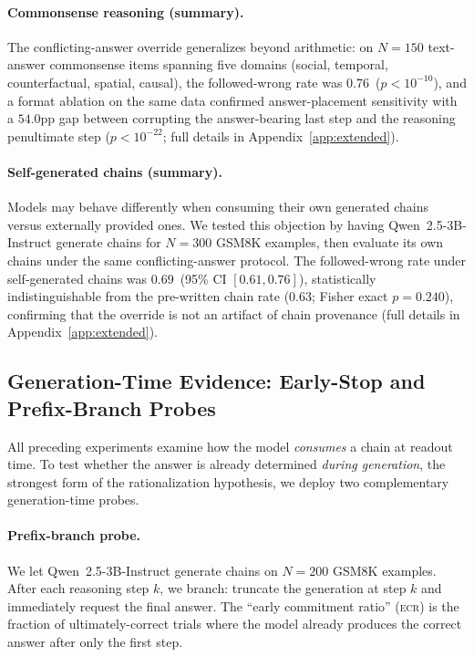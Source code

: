 \documentclass{article}
\theoremstyle{definition}
\theoremstyle{definition}
\newcommand{\CCFW}{0.63}
\newcommand{\CSCCFW}{0.76}
\newcommand{\CSPVAL}{$p{<}10^{-10}$}
\newcommand{\GENNEXAMPLES}{300}
\newcommand{\SGCCFW}{0.69}
\newcommand{\SGCCFWCILOW}{0.61}
\newcommand{\SGCCFWCIHIGH}{0.76}
\newcommand{\SGVSPREWRITTENPVAL}{0.240}
\newcommand{\CSAGAPPVAL}{$p{<}10^{-22}$}
\newcommand{\GENPBN}{200}
\begin{document}
\paragraph{Commonsense reasoning (summary).}
The conflicting-answer override generalizes beyond arithmetic: on $N{=}150$
text-answer commonsense items spanning five domains (social, temporal,
counterfactual, spatial, causal), the followed-wrong rate was \CSCCFW\
(\CSPVAL), and a format ablation on the same data confirmed answer-placement
sensitivity with a $54.0$pp gap between corrupting the answer-bearing last step
and the reasoning penultimate step (\CSAGAPPVAL; full details in
Appendix~\ref{app:extended}).

\paragraph{Self-generated chains (summary).}
Models may behave differently when consuming their own generated chains versus
externally provided ones. We tested this objection by having Qwen~2.5-3B-Instruct
generate chains for $N{=}\GENNEXAMPLES$ GSM8K examples, then evaluate its own chains
under the same conflicting-answer protocol. The followed-wrong rate under self-generated
chains was \SGCCFW\ (95\% CI $[\SGCCFWCILOW, \SGCCFWCIHIGH]$), statistically
indistinguishable from the pre-written chain rate (\CCFW; Fisher exact
$p{=}\SGVSPREWRITTENPVAL$), confirming that the override is not an artifact of
chain provenance (full details in Appendix~\ref{app:extended}).

\subsection{Generation-Time Evidence: Early-Stop and Prefix-Branch Probes}
\label{sec:generation_probes}

All preceding experiments examine how the model \emph{consumes} a chain at
readout time. To test whether the answer is already determined
\emph{during generation}, the strongest form of the rationalization
hypothesis, we deploy two complementary generation-time probes.

\paragraph{Prefix-branch probe.}
We let Qwen~2.5-3B-Instruct generate chains on $N{=}\GENPBN$ GSM8K
examples. After each reasoning step $k$, we branch: truncate the
generation at step $k$ and immediately request the final answer.
The ``early commitment ratio'' (\textsc{ecr}) is the fraction of
ultimately-correct trials where the model already produces the correct
answer after only the first step.
\end{document}
